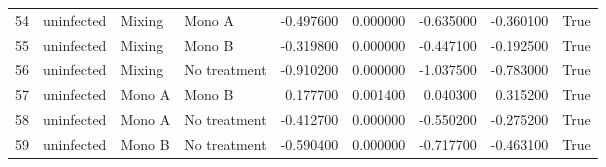\begin{tabular}{llllrrrrr}
54 & uninfected & Mixing & Mono A & -0.497600 & 0.000000 & -0.635000 & -0.360100 & True \\
55 & uninfected & Mixing & Mono B & -0.319800 & 0.000000 & -0.447100 & -0.192500 & True \\
56 & uninfected & Mixing & No treatment & -0.910200 & 0.000000 & -1.037500 & -0.783000 & True \\
57 & uninfected & Mono A & Mono B & 0.177700 & 0.001400 & 0.040300 & 0.315200 & True \\
58 & uninfected & Mono A & No treatment & -0.412700 & 0.000000 & -0.550200 & -0.275200 & True \\
59 & uninfected & Mono B & No treatment & -0.590400 & 0.000000 & -0.717700 & -0.463100 & True \\
\bottomrule
\end{tabular}
